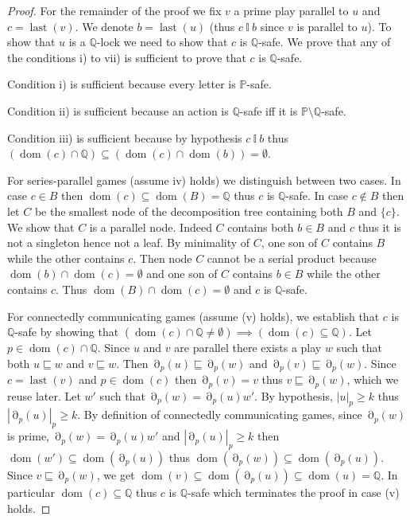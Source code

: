 \documentclass[a4paper,UKenglish]{lipics-v2016}
\newcommand{\PP}{\mathbb{P}}
\newcommand{\QQ}{\mathbb{Q}}
\newcommand{\ind}{~\mathbb{I}~}
\newcommand{\pref}{\sqsubseteq}
\DeclareMathOperator{\dom}{dom}
\DeclareMathOperator{\view}{\partial}
\DeclareMathOperator{\last}{last}
\begin{document}
\begin{proof}
For the remainder of the proof we fix $v$ a prime play parallel to $u$ and $c=\last(v)$.
We  denote $b=\last(u)$ (thus $c \ind b$ since $v$ is parallel to $u$).
To show that $u$ is a $\QQ$-lock we need to show that $c$ is $\QQ$-safe.
We prove that any of the conditions i) to vii) is sufficient to prove that $c$ is $\QQ$-safe.

\medskip

Condition i) is sufficient because every letter is $\PP$-safe. 

\medskip

Condition ii) is sufficient because an action is $\QQ$-safe iff it is  $\PP\setminus \QQ$-safe.

\medskip


Condition iii) is sufficient because by hypothesis $c \ind b$ thus $(\dom(c) \cap \QQ)\subseteq 
(\dom(c) \cap\dom(b)) =\emptyset$.

\medskip


For series-parallel games (assume iv) holds) we distinguish between two cases.
In case $c\in B$ then $\dom(c) \subseteq \dom(B)=\QQ$
thus $c$ is $\QQ$-safe.
In case $c\not\in B$ then let $C$ be the smallest node of the decomposition tree containing both $B$ and $\{c\}$.
We show that $C$ is a parallel node.
Indeed $C$ contains both $b\in B$ and $c$ thus it is not a singleton hence not a leaf.
By minimality of $C$, one son of $C$ contains $B$ while the other contains $c$.
Then node $C$ cannot be a serial product because
$\dom(b)\cap \dom(c) =\emptyset$ and one son of $C$ contains $b\in B$ while the other contains $c$.
Thus $\dom(B) \cap \dom(c) =\emptyset$ and $c$ is $\QQ$-safe.

\medskip

For connectedly communicating games (assume (v) holds),
we establish that $c$ is $\QQ$-safe 
by showing that $(\dom(c) \cap \QQ \neq \emptyset) \implies (\dom(c) \subseteq \QQ)$.
Let $p \in \dom(c) \cap \QQ$.
Since $u$ and $v$ are parallel there exists a play $w$
such that both $u \pref w$ and $v \pref w$.
Then $\view_p(u)\pref \view_p(w)$ and $\view_p(v) \pref \view_p(w)$.
Since $c=\last(v)$ and $p \in \dom(c)$ then 
$\view_p(v)=v$ thus $v \pref \view_p(w)$, which we reuse later.
Let $w'$ such that $\view_p(w)= \view_p(u)w'$.
By hypothesis, 
$|u|_p\geq k$ thus $|\view_p(u)|_p\geq k$.
By definition of connectedly communicating games,
since $\view_p(w)$ is prime,
$\view_p(w)= \view_p(u)w'$
and $|\view_p(u)|_p\geq k$
 then
$\dom(w') \subseteq \dom(\view_p(u))$ thus  $\dom(\view_p(w)) \subseteq \dom(\view_p(u))$.
Since $v \pref \view_p(w)$, we get $\dom(v) \subseteq\dom(\view_p(u)) \subseteq \dom(u) = \QQ$.
In particular $\dom(c) \subseteq \QQ$ thus $c$ is $\QQ$-safe which terminates the proof in case (v) holds.


\end{proof}
\end{document}
